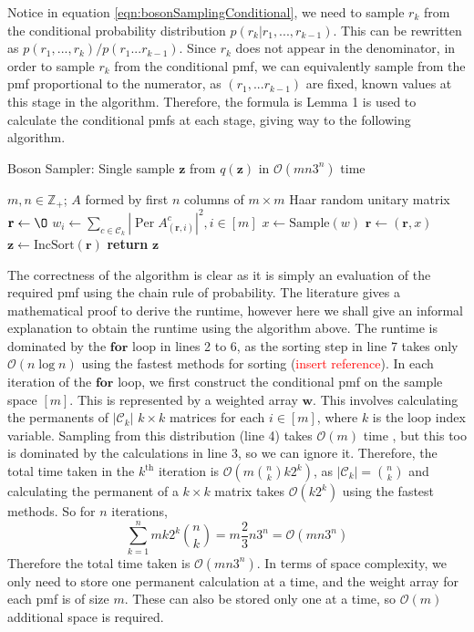 \documentclass[11pt]{article}
\theoremstyle{theorem}
\theoremstyle{remark}
\theoremstyle{plain}
\theoremstyle{definition}
\DeclareMathOperator*{\Per}{\mathrm{Per}}
\begin{document}
Notice in equation \ref{eqn:bosonSamplingConditional}, we need to sample $r_k$ from the conditional probability distribution $p(r_k | r_1, ... , r_{k-1})$. This can be rewritten as $p(r_1, ... , r_k)/p(r_1 ... r_{k-1})$. Since $r_k$ does not appear in the denominator, in order to sample $r_k$ from the conditional pmf, we can equivalently sample from the pmf proportional to the numerator, as $(r_1, ... r_{k-1})$ are fixed, known values at this stage in the algorithm. Therefore, the formula is Lemma 1 is used to calculate the conditional pmfs at each stage, giving way to the following algorithm.

\begin{algorithm}
\caption{Boson Sampler: Single sample $\mathbf{z}$ from $q(\mathbf{z})$ in $\mathcal{O}(mn3^n)$ time}
\begin{algorithmic}[1]
\Require $m, n \in \mathbb{Z}_+$; $A$ formed by first $n$ columns of $m \times m$ Haar random unitary matrix
\State $\mathbf{r} \leftarrow \O $
\State $w_i \leftarrow \sum_{c \in \mathcal{C}_k} \left| \Per A_{(\mathbf{r}, i)}^c \right| ^2, i \in [m] $
\State $x \leftarrow \text{Sample}(w)$
\State $\mathbf{r} \leftarrow (\mathbf{r}, x)$
\EndFor
\State $\mathbf{z} \leftarrow \text{IncSort}(\mathbf{r})$
\State \textbf{return} $\mathbf{z}$
\end{algorithmic}
\end{algorithm}

The correctness of the algorithm is clear as it is simply an evaluation of the required pmf using the chain rule of probability. The literature gives a mathematical proof to derive the runtime, however here we shall give an informal explanation to obtain the runtime using the algorithm above. The runtime is dominated by the $\textbf{for}$ loop in lines 2 to 6, as the sorting step in line 7 takes only $\mathcal{O}(n \log n)$ using the fastest methods for sorting (\textcolor{red}{insert reference}). In each iteration of the $\textbf{for}$ loop, we first construct the conditional pmf on the sample space $[m]$. This is represented by a weighted array $\textbf{w}$. This involves calculating the permanents of $\left|\mathcal{C}_k\right|$ $k \times k$ matrices for each $i \in [m]$, where $k$ is the loop index variable. Sampling from this distribution (line 4) takes $\mathcal{O}(m)$ time \cite{walker1974}, but this too is dominated by the calculations in line 3, so we can ignore it. Therefore, the total time taken in the $k^\text{th}$ iteration is $\mathcal{O}(m \binom{n}{k} k 2^k)$, as $\left|\mathcal{C}_k\right| = \binom{n}{k}$ and calculating the permanent of a $k \times k$ matrix takes $\mathcal{O}(k 2^k)$ using the fastest methods. So for $n$ iterations,
\begin{equation}
\sum_{k=1}^n m k 2^k \binom{n}{k} = m \frac{2}{3} n 3^n = \mathcal{O}(mn3^n)
\end{equation}
Therefore the total time taken is $\mathcal{O}(mn3^n)$. In terms of space complexity, we only need to store one permanent calculation at a time, and the weight array for each pmf is of size $m$. These can also be stored only one at a time, so $\mathcal{O}(m)$ additional space is required.
\end{document}
